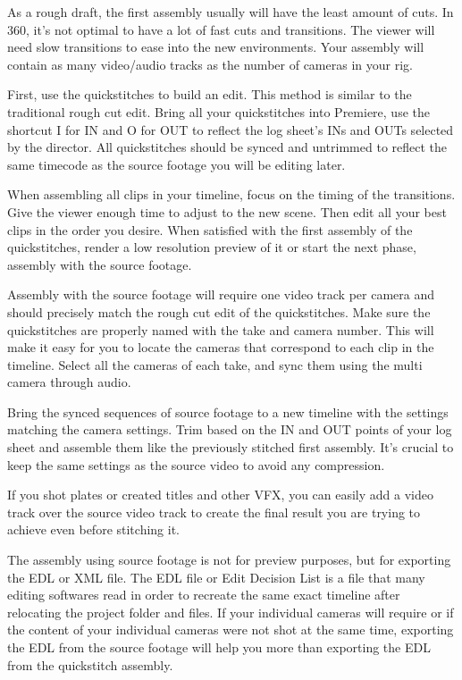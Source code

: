 \begin{fullwidth}
As a rough draft, the first assembly usually will have the least amount of cuts. In 360, it’s not optimal to have a lot of fast cuts and transitions. The viewer will need slow transitions to ease into the new environments. Your assembly will contain as many video/audio tracks as the number of cameras in your rig. 

First, use the quickstitches to build an edit. This method is similar to the traditional rough cut edit. Bring all your quickstitches into Premiere, use the shortcut I for IN and O for OUT to reflect the log sheet's INs and OUTs selected by the director. All quickstitches should be synced and untrimmed to reflect the same timecode as the source footage you will be editing later.

When assembling all clips in your timeline, focus on the timing of the transitions. Give the viewer enough time to adjust to the new scene. Then edit all your best clips in the order you desire. When satisfied with the first assembly of the quickstitches, render a low resolution preview of it or start the next phase, assembly with the source footage.


Assembly with the source footage will require one video track per camera and should precisely match the rough cut edit of the quickstitches. Make sure the quickstitches are properly named with the take and camera number. This will make it easy for you to locate the cameras that correspond to each clip in the timeline. Select all the cameras of each take, and sync them using the multi camera \textbf{} through audio.

Bring the synced sequences of source footage to a new timeline with the settings matching the camera settings. Trim based on the IN and OUT points of your log sheet and assemble them like the previously stitched first assembly. It’s crucial to keep the same settings as the source video to avoid any compression. 

If you shot plates or created titles and other VFX, you can easily add a video track over the source video track to create the final result you are trying to achieve even before stitching it.


The assembly using source footage is not for preview purposes, but for exporting the EDL or XML file. The EDL file or Edit Decision List is a file that many editing softwares read in order to recreate the same exact timeline after relocating the project folder and files. If your individual cameras will require \textbf{} or if the content of your individual cameras were not shot at the same time, exporting the EDL from the source footage will help you more than exporting the EDL from the quickstitch assembly.


\end{fullwidth}
